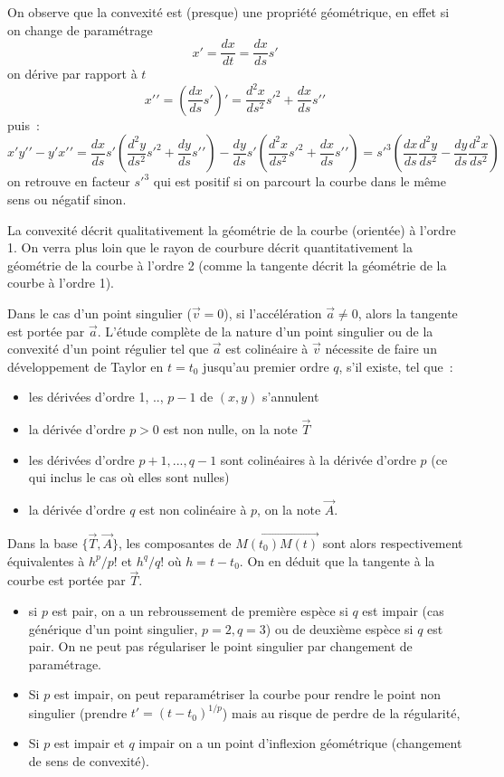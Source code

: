 \documentclass[a4paper,11pt]{article}
\begin{document}
\begin{giacjshere}
On observe que la convexit\'e est (presque) une propri\'et\'e g\'eom\'etrique,
en effet si on change de param\'etrage
$$ x'=\frac{dx}{dt} =\frac{dx}{ds} s' $$
on d\'erive par rapport \`a $t$
$$ x'{'} = (\frac{dx}{ds} s')'=\frac{d^2x}{ds^2} s'^2 + \frac{dx}{ds}
s'{'} $$
puis~:
$$ x'y'{'}- y' x'{'} = 
\frac{dx}{ds} s' (\frac{d^2y}{ds^2} s'^2 +\frac{dy}{ds} s'{'} ) - 
\frac{dy}{ds} s' (\frac{d^2x}{ds^2} s'^2 +\frac{dx}{ds} s'{'} ) 
= s'^3 (\frac{dx}{ds} \frac{d^2y}{ds^2} - 
\frac{dy}{ds} \frac{d^2x}{ds^2} )
 $$
on retrouve en facteur $s'^3$ qui est positif si on parcourt la courbe
dans le m\^eme sens ou n\'egatif sinon.

La convexit\'e d\'ecrit qualitativement la g\'eom\'etrie
de la courbe (orient\'ee) \`a l'ordre 1. 
On verra plus loin que le rayon de courbure d\'ecrit
quantitativement la g\'eom\'etrie de la courbe \`a l'ordre
2 (comme la tangente d\'ecrit la g\'eom\'etrie de la courbe
\`a l'ordre 1).

Dans le cas d'un point singulier ($\overrightarrow{v}=0$), si 
l'acc\'el\'eration $\overrightarrow{a}\neq 0$, alors la
tangente est port\'ee par $\overrightarrow{a}$. L'\'etude compl\`ete
de la nature
d'un point singulier ou de la convexit\'e d'un point r\'egulier
tel que $\overrightarrow{a}$ est colin\'eaire \`a $\overrightarrow{v}$ 
n\'ecessite de faire un
d\'eveloppement de Taylor en $t=t_0$
jusqu'au premier ordre $q$, s'il existe, tel que~: 
\begin{itemize}
\item les d\'eriv\'ees d'ordre 1, .., $p-1$ de $(x,y)$ s'annulent
\item la d\'eriv\'ee d'ordre $p>0$ est non nulle, on la note $\overrightarrow{T}$
\item les d\'eriv\'ees d'ordre $p+1,...,q-1$ sont colin\'eaires
\`a la d\'eriv\'ee d'ordre $p$ (ce qui inclus le cas o\`u elles
sont nulles)
\item la d\'eriv\'ee d'ordre $q$ est non colin\'eaire \`a $p$,
on la note $\overrightarrow{A}$.
\end{itemize}
Dans la base $\{ \overrightarrow{T},\overrightarrow{A}\}$, les
composantes de $\overrightarrow{M(t_0)M(t)}$
sont alors respectivement \'equivalentes \`a $h^p/p!$ et $h^q/q!$
o\`u $h=t-t_0$.
On en d\'eduit que la tangente \`a la courbe est port\'ee par
$\overrightarrow{T}$.
\begin{itemize}
\item si $p$ est pair, on a un rebroussement 
de premi\`ere esp\`ece 
si $q$ est impair (cas g\'en\'erique d'un point singulier, $p=2, q=3$)
ou de deuxi\`eme esp\`ece si $q$ est pair. On ne peut pas
r\'egulariser le point singulier par changement de param\'etrage.
\item Si $p$ est impair, on peut reparam\'etriser la courbe
pour rendre le point non singulier (prendre $t'=(t-t_0)^{1/p}$)
mais au risque de perdre de la r\'egularit\'e,
\item Si $p$ est impair et $q$ impair on a un point d'inflexion 
g\'eom\'etrique (changement de sens de convexit\'e).
\end{itemize}


\end{giacjshere}
\end{document}
